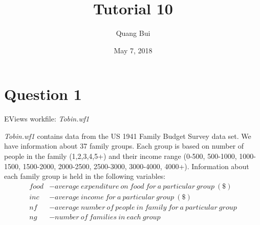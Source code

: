\documentclass[12pt]{report}
\title{Tutorial 10}
\subtitle
{
\textbf{keywords}: grouped data, variance, error, heteroskedasticity, homoskedasticity, residual plots, Breusch-Pagan test, inference, efficiency, Weighted Least Squares estimator

\textbf{estimated reading time}: 32 minutes
}
\author{Quang Bui}
\date{May 7, 2018}
\begin{document}
\maketitle

\section*{Question 1}
\noindent EViews workfile: \textit{Tobin.wf1}

\noindent \textit{Tobin.wf1} contains data from the US 1941 Family Budget Survey data set. We have information about 37 family groups. Each group is based on number of people in the family (1,2,3,4,5+) and their income range (0-500, 500-1000, 1000-1500, 1500-2000, 2000-2500, 2500-3000, 3000-4000, 4000+). Information about each family group is held in the following variables:
\begin{align*}
food &- average\ expenditure\ on\ food\ for\ a\ particular\ group\ (\$) \\
inc &- average\ income\ for\ a\ particular\ group\ (\$) \\
nf &- average\ number\ of\ people\ in\ family\ for\ a\ particular\ group \\
ng &- number\ of\ families\ in\ each\ group
\end{align*}
\vspace{-\baselineskip}
\end{document}
